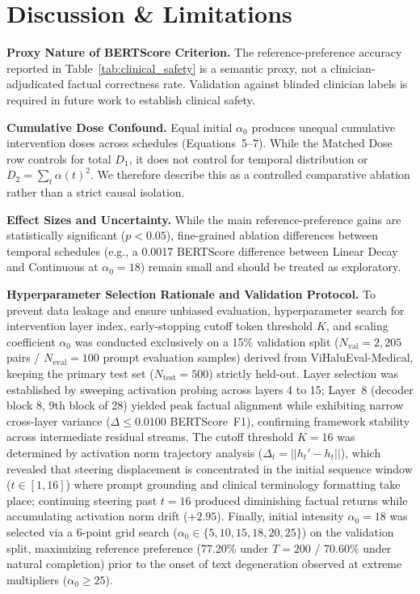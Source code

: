 \documentclass[conference]{IEEEtran}
\begin{document}
\section{Discussion \& Limitations}

\textbf{Proxy Nature of BERTScore Criterion.} The reference-preference accuracy reported in Table~\ref{tab:clinical_safety} is a semantic proxy, not a clinician-adjudicated factual correctness rate. Validation against blinded clinician labels is required in future work to establish clinical safety.

\textbf{Cumulative Dose Confound.} Equal initial $\alpha_0$ produces unequal cumulative intervention doses across schedules (Equations~5--7). While the Matched Dose row controls for total $D_1$, it does not control for temporal distribution or $D_2 = \sum_t \alpha(t)^2$. We therefore describe this as a controlled comparative ablation rather than a strict causal isolation.

\textbf{Effect Sizes and Uncertainty.} While the main reference-preference gains are statistically significant ($p < 0.05$), fine-grained ablation differences between temporal schedules (e.g., a 0.0017 BERTScore difference between Linear Decay and Continuous at $\alpha_0=18$) remain small and should be treated as exploratory.

\textbf{Hyperparameter Selection Rationale and Validation Protocol.} To prevent data leakage and ensure unbiased evaluation, hyperparameter search for intervention layer index, early-stopping cutoff token threshold $K$, and scaling coefficient $\alpha_0$ was conducted exclusively on a 15\% validation split ($N_{\text{val}} = 2,205$ pairs / $N_{\text{eval}}=100$ prompt evaluation samples) derived from ViHaluEval-Medical, keeping the primary test set ($N_{\text{test}}=500$) strictly held-out. Layer selection was established by sweeping activation probing across layers 4 to 15; Layer~8 (decoder block 8, 9th block of 28) yielded peak factual alignment while exhibiting narrow cross-layer variance ($\Delta \le 0.0100$ BERTScore~F1), confirming framework stability across intermediate residual streams. The cutoff threshold $K=16$ was determined by activation norm trajectory analysis ($\Delta_t = ||h_t' - h_t||$), which revealed that steering displacement is concentrated in the initial sequence window ($t \in [1, 16]$) where prompt grounding and clinical terminology formatting take place; continuing steering past $t=16$ produced diminishing factual returns while accumulating activation norm drift ($+2.95$). Finally, initial intensity $\alpha_0=18$ was selected via a 6-point grid search ($\alpha_0 \in \{5, 10, 15, 18, 20, 25\}$) on the validation split, maximizing reference preference (77.20\% under $T=200$ / 70.60\% under natural completion) prior to the onset of text degeneration observed at extreme multipliers ($\alpha_0 \ge 25$).
\end{document}
